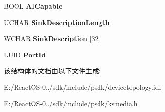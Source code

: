 \begin{DoxyCompactItemize}
B\+O\+OL {\bfseries A\+I\+Capable}
\item 
\mbox{\label{struct__tag_k_s_j_a_c_k___s_i_n_k___i_n_f_o_r_m_a_t_i_o_n_ae06013e901d67da0d50294fd60e4dfb3}} 
U\+C\+H\+AR {\bfseries Sink\+Description\+Length}
\item 
\mbox{\label{struct__tag_k_s_j_a_c_k___s_i_n_k___i_n_f_o_r_m_a_t_i_o_n_ade9abcc94fe90bf9de8f6f796f632413}} 
W\+C\+H\+AR {\bfseries Sink\+Description} \mbox{[}32\mbox{]}
\item 
\mbox{\label{struct__tag_k_s_j_a_c_k___s_i_n_k___i_n_f_o_r_m_a_t_i_o_n_af1ceb41acac11ecc2578f857590e7156}} 
\hyperlink{struct___l_u_i_d}{L\+U\+ID} {\bfseries Port\+Id}
\end{DoxyCompactItemize}


该结构体的文档由以下文件生成\+:\begin{DoxyCompactItemize}
\item 
E\+:/\+React\+O\+S-\/0../sdk/include/psdk/devicetopology.\+idl\item 
E\+:/\+React\+O\+S-\/0../sdk/include/psdk/ksmedia.\+h\end{DoxyCompactItemize}
